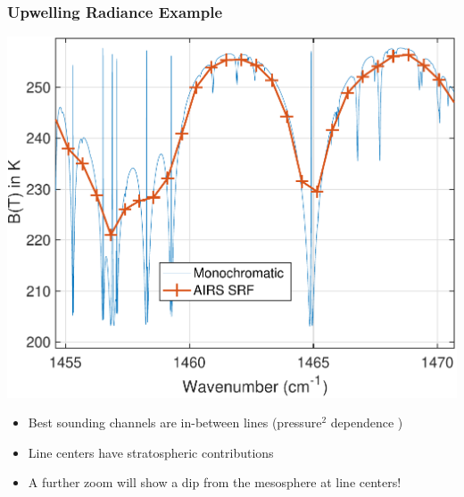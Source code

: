 \documentclass[10pt,t]{beamer}
\begin{document}
\begin{frame}
  \frametitle{Upwelling Radiance Example}
\vspace{-0.05in}
  \centering \includegraphics[width=0.75\linewidth]{Figslls/mono1460.pdf}
\vspace{-0.05in}
\begin{small}
\begin{itemize}
  \item Best sounding channels are in-between lines (pressure$^2$ dependence \vspace{-0.03in})
  \item Line centers have stratospheric contributions \vspace{-0.03in}
  \item A further zoom will show a dip from the mesosphere at line centers!
  \end{itemize}
\end{small}
\end{frame}
\end{document}
